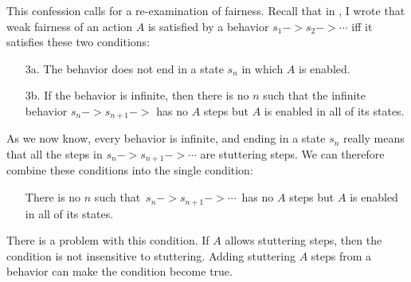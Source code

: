 \documentclass[fleqn,leqno]{article}
\begin{document}
This confession calls for
a re-examination of fairness.  Recall that in
  ,
I wrote that weak fairness of an action $A$ is satisfied by
a behavior $s_{1}-> s_{2} -> \cdots$ iff it satisfies these two conditions:
\begin{itemize}
\item[3a.] The behavior does not end in a state $s_{n}$ in which
$A$ is enabled.

\item[3b.] If the behavior is infinite, then there is no $n$ such
that the infinite behavior $s_{n}->s_{n+1}-> $ has no $A$ steps
but $A$ is enabled in all of its states.
\end{itemize}
As we now know, every behavior is infinite, and ending in a state
$s_{n}$ really means that all the steps in $s_{n}->s_{n+1}->\cdots$
are stuttering steps.  We can therefore combine these conditions into
the single condition:
\begin{itemize}
\item[] There is no $n$ such that \,$s_{n}->s_{n+1}->\cdots$\, has no $A$ steps
but $A$ is enabled in all of its states.
\end{itemize}
There is a problem with this condition.  If $A$ allows stuttering
steps, then the condition is not insensitive to stuttering.  Adding
stuttering $A$ steps from a behavior can make the condition become
true.
\end{document}
